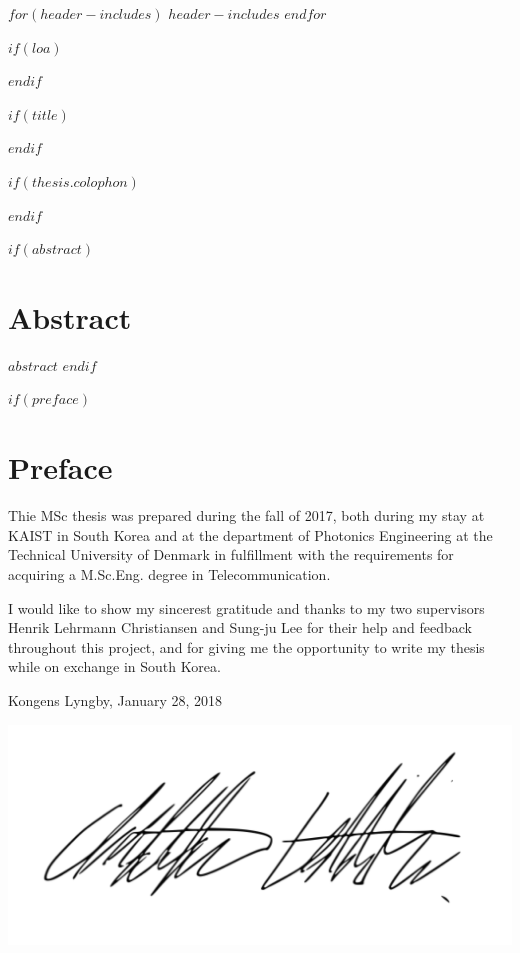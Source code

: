 $for(header-includes)$
  $header-includes$
$endfor$

$if(loa)$
\makeglossaries

$endif$



$if(title)$
\prefrontmatter

\cleartoevenpage

$endif$

$if(thesis.colophon)$

\cleartooddpage
$endif$

\frontmatter

$if(abstract)$
\chapter*{Abstract}
\setcounter{chapter}{0}
$abstract$
\clearforchapter
$endif$

$if(preface)$
\chapter*{Preface}
\setcounter{chapter}{0}

Thie MSc thesis was prepared during the fall of 2017, both during my stay at KAIST in South Korea and at the department of Photonics Engineering at the Technical University of Denmark in fulfillment with the requirements for acquiring a M.Sc.Eng. degree in Telecommunication.

I would like to show my sincerest gratitude and thanks to my two supervisors Henrik Lehrmann Christiansen and Sung-ju Lee for their help and feedback throughout this project, and for giving me the opportunity to write my thesis while on exchange in South Korea.
\ \ \

Kongens Lyngby, January 28, 2018

\includegraphics[scale=0.4]{Graphic/Signature.png}

